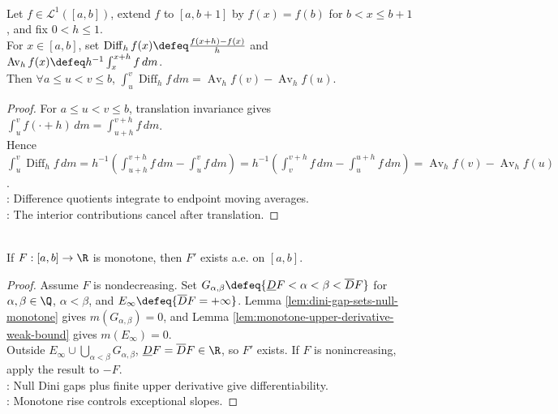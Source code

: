 \begin{proposition} \label{prop:divided-difference-average-identity} \\
Let $f\in\mathscr{L}^1([a,b])$, extend $f$ to $[a,b+1]$ by $f(x)=f(b)$ for $b<x\leq b+1$, and fix $0<h\leq1$.\\
For $x\in[a,b]$, set $\operatorname{Diff}_hf(x)\defeq\frac{f(x+h)-f(x)}{h}$ and $\operatorname{Av}_hf(x)\defeq h^{-1}\int_x^{x+h}f\,dm$.\\
Then $\forall a\leq u<v\leq b$, $\int_u^v\operatorname{Diff}_hf\,dm=\operatorname{Av}_hf(v)-\operatorname{Av}_hf(u)$.
\begin{proof} For $a\leq u<v\leq b$, translation invariance gives $\int_u^vf(\cdot+h)\,dm=\int_{u+h}^{v+h}f\,dm$.\\
Hence $\int_u^v\operatorname{Diff}_hf\,dm=h^{-1}(\int_{u+h}^{v+h}f\,dm-\int_u^vf\,dm)=h^{-1}(\int_v^{v+h}f\,dm-\int_u^{u+h}f\,dm)=\operatorname{Av}_hf(v)-\operatorname{Av}_hf(u)$.\\
: Difference quotients integrate to endpoint moving averages.\\
: The interior contributions cancel after translation.
\end{proof}
\end{proposition}

\begin{theorem} \label{thm:lebesgue-last-theorem-and-consequences} \\
If $F:[a,b]\to\R$ is monotone, then $F'$ exists a.e. on $[a,b]$.
\begin{proof}
Assume $F$ is nondecreasing. Set $G_{\alpha,\beta}\defeq\{\underline{D}F<\alpha<\beta<\overline{D}F\}$ for $\alpha,\beta\in\Q$, $\alpha<\beta$, and $E_\infty\defeq\{\overline{D}F=+\infty\}$. Lemma \ref{lem:dini-gap-sets-null-monotone} gives $m(G_{\alpha,\beta})=0$, and Lemma \ref{lem:monotone-upper-derivative-weak-bound} gives $m(E_\infty)=0$.\\
Outside $E_\infty\cup\bigcup_{\alpha<\beta}G_{\alpha,\beta}$, $\underline{D}F=\overline{D}F\in\R$, so $F'$ exists. If $F$ is nonincreasing, apply the result to $-F$.\\
: Null Dini gaps plus finite upper derivative give differentiability.\\
: Monotone rise controls exceptional slopes.
\end{proof}
\end{theorem}

